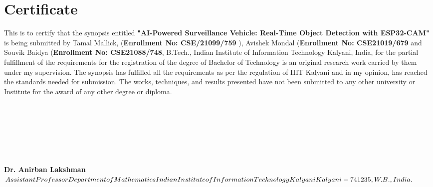 \documentclass[12pt,a4paper]{report}
\newcommand{\mytitle}{AI-Powered Surveillance Vehicle:
Real-Time Object Detection with ESP32-CAM}
\begin{document}
\restoregeometry


%
	\newpage
	\chapter*{\centering Certificate}
\label{sec:engack}
This is to certify that the synopsis entitled \textbf{"\mytitle "} is being submitted by Tamal Mallick,
 (\textbf{Enrollment No: CSE/21099/759 }), Avishek Mondal (\textbf{Enrollment No: CSE21019/679} and Souvik Baidya (\textbf{Enrollment No: CSE21088/748}, B.Tech., Indian Institute of Information Technology Kalyani, India, for the partial fulfillment of the requirements for the registration of the degree of Bachelor of Technology is an original research work carried by them under my supervision. The synopsis has fulfilled all the requirements as per the regulation of IIIT Kalyani and in my opinion, has reached the standards needed for submission. The works, techniques, and results presented have not been submitted to any other university or Institute for the award of any other degree or diploma.
\\
\\
\\
\\
\\
\\
\\
\\
\textbf{Dr. Anirban Lakshman}  \\ 
$Assistant Professor \\  
Department of Mathematics\\
Indian Institute of Information Technology Kalyani\\
Kalyani-741235, W.B., India.
$
\cleardoublepage
\end{document}
